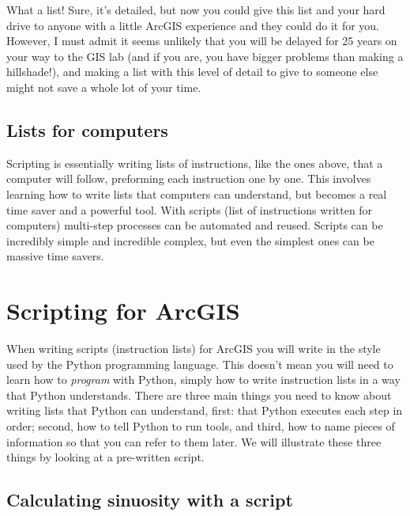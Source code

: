 \documentclass{article}
\begin{document}
What a list!  Sure, it's detailed, but now you could give this list and your hard drive to anyone with a little ArcGIS experience and they could do it for you.  However, I must admit it seems unlikely that you will be delayed for 25 years on your way to the GIS lab (and if you are, you have bigger problems than making a hillshade!), and making a list with this level of detail to give to someone else might not save a whole lot of your time.  

\subsection{Lists for computers}
Scripting is essentially writing lists of instructions, like the ones above, that a computer will follow, preforming each instruction one by one.  This involves learning how to write lists that computers can understand, but becomes a real time saver and a powerful tool.  With scripts (list of instructions written for computers) multi-step processes can be automated and reused.  Scripts can be incredibly simple and incredible complex, but even the simplest ones can be massive time savers.

\section{Scripting for ArcGIS}
When writing scripts (instruction lists) for ArcGIS you will write in the style used by the Python programming language.  This doesn't mean you will need to learn how to \textit{program} with Python, simply how to write instruction lists in a way that Python understands.  There are three main things you need to know about writing lists that Python can understand, first: that Python executes each step in order; second, how to tell Python to run tools, and third, how to name pieces of information so that you can refer to them later.  We will illustrate these three things by looking at a pre-written script.
\subsection{Calculating sinuosity with a script}
\end{document}
